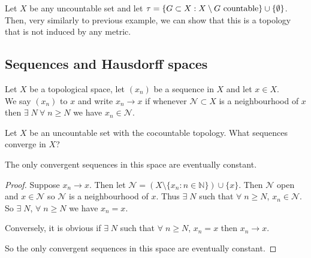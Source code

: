 \begin{example}
    Let $X$ be any uncountable set and let $\tau = \{G\subset X : X \setminus G \textup{ countable} \} \cup \{\emptyset\}$. Then, very similarly to previous example, we can show that this is a topology that is not induced by any metric.
\end{example} 

\subsection{Sequences and Hausdorff spaces}

\begin{definition}[Convergence]
Let $X$ be a topological space, let $(x_n)$ be a sequence in $X$ and let $x\in X$. \\
We say $(x_n)$  to $x$ and write $x_n \to x$ if whenever $\mathcal{N}\subset X$ is a neighbourhood of $x$ then $\exists \; N \ \forall \; n \geq N$ we have $x_n \in \mathcal{N}$.
\end{definition}


\begin{example}
    Let $X$ be an uncountable set with the cocountable topology. What sequences converge in $X$?

    The only convergent sequences in this space are eventually constant.
    
    \begin{proof}
    Suppose $x_n \to x$. Then let $\mathcal{N} = (X \setminus \{x_n : n \in \mathbb{N}\})\cup\{x\}$. Then $\mathcal{N}$ open and $x\in \mathcal{N}$ so $\mathcal{N}$ is a neighbourhood of $x$. Thus $\exists \; N$ such that $\forall \; n \geq N$, $x_n\in \mathcal{N}$. So $\exists \; N$, $\forall \; n \geq N$ we have $x_n=x$.
    
    Conversely, it is obvious if $\exists \; N$ such that $\forall \; n \geq N$, $x_n=x$ then $x_n \to x$.
    
    So the only convergent sequences in this space are eventually constant.
    \end{proof}
\end{example} 

